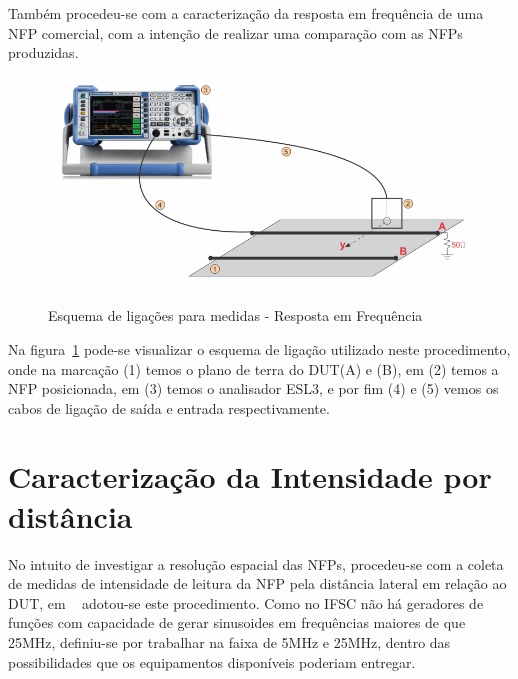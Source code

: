 % 
% 
% 

Também procedeu-se com a caracterização da resposta em frequência de uma NFP comercial, com a intenção de realizar uma comparação com as NFPs produzidas.

\begin{figure}[htb!]
	\centering 
	\caption{Esquema de ligações para medidas - Resposta em Frequência}
	\includegraphics[scale=2.4]{./img/esquema2_fundo}
	\label{fig:esquema2_fundo}
\end{figure}

Na figura~\ref{fig:esquema2_fundo} pode-se visualizar o esquema de ligação utilizado neste procedimento, onde na marcação (1) temos o plano de terra do DUT(A) e (B), em (2) temos a NFP posicionada, em (3) temos o analisador ESL3, e por fim (4) e (5) vemos os cabos de ligação de saída e entrada respectivamente.

\section{Caracterização da Intensidade por distância}
No intuito de investigar a resolução espacial das NFPs, procedeu-se com a coleta de medidas de intensidade de leitura da NFP pela distância lateral em relação ao DUT, em ~ adotou-se este procedimento. Como no IFSC não há geradores de funções com capacidade de gerar sinusoides em frequências maiores de que 25MHz, definiu-se por trabalhar na faixa de 5MHz e 25MHz, dentro das possibilidades que os equipamentos disponíveis poderiam entregar.


